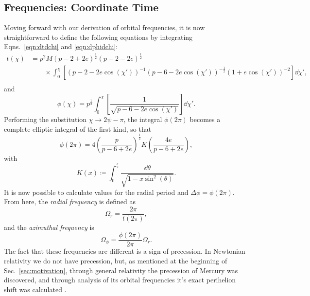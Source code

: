 \subsection{Frequencies: Coordinate Time}
Moving forward with our derivation of orbital frequencies, it is now straightforward to define the following equations by integrating Eqns.~\eqref{eqn:dtdchi} and \eqref{eqn:dphidchi}:
\begin{equation}
\begin{split}
t(\chi)&=p^2M(p-2+2e)^{\frac{1}{2}}(p-2-2e)^{\frac{1}{2}}\\
&\qquad\times\int_0^\chi\left[(p-2-2e\cos(\chi'))^{-1}(p-6-2e\cos(\chi'))^{-\frac{1}{2}}(1+e\cos(\chi'))^{-2}\right]\dd{\chi'},\\
\end{split}
\end{equation}
and
\begin{equation}
\phi(\chi)=p^{\frac{1}{2}}\int_0^\chi\left[\frac{1}{\sqrt{p-6-2e\cos(\chi')}}\right]\dd{\chi'}.
\end{equation}
Performing the substitution $\chi \rightarrow 2\psi-\pi$, the integral $\phi(2\pi)$ becomes a complete elliptic integral of the first kind, so that
\begin{equation}
\phi(2\pi)=4\left(\frac{p}{p-6+2e} \right)^{\frac{1}{2}}K\left(\frac{4e}{p-6+2e}\right),
\end{equation}
with
\begin{equation}\label{eqn:ellipticintegral}
    K(x)\coloneqq \int_{0}^{\frac{\pi}{2}}\frac{\dd{\theta}}{\sqrt{1-x\sin^2(\theta)}}.
\end{equation}
It is now possible to calculate values for the radial period and $\Delta\phi=\phi(2\pi)$.
From here, the \textit{radial frequency} is defined as 
\begin{equation}\label{eqn:radfreqdar}
\Omega_r=\frac{2\pi}{t(2\pi)},
\end{equation}
and the \textit{azimuthal frequency} is
\begin{equation}\label{eqn:phifreqdar}
\Omega_\phi=\frac{\phi(2\pi)}{2\pi}\Omega_r.
\end{equation}
The fact that these frequencies are different is a sign of precession.
In Newtonian relativity we do not have precession, but, as mentioned at the beginning of Sec.~\eqref{sec:motivation}, through general relativity the precession of Mercury was discovered, and through analysis of its orbital frequencies it's exact perihelion shift was calculated \cite{mercuryPrecess}.

